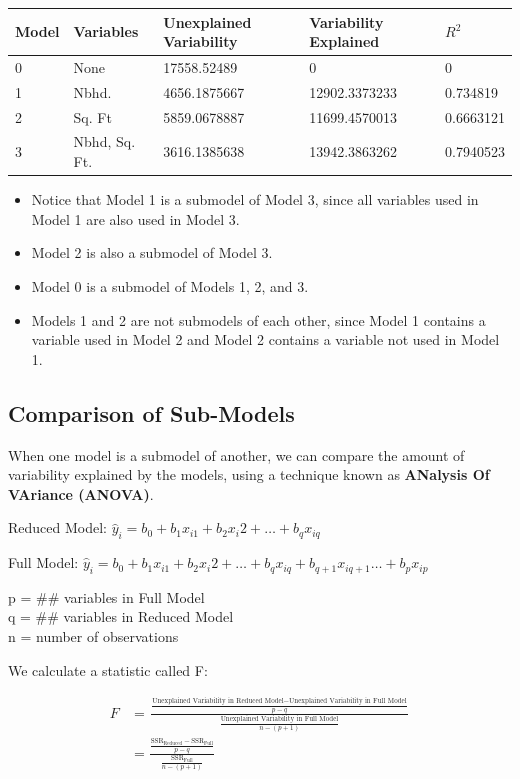 \documentclass[]{book}
\begin{document}
\begin{longtable}[]{@{}lllll@{}}
\toprule
Model & Variables & Unexplained Variability & Variability Explained &
\(R^2\)\tabularnewline
\midrule
\endhead
0 & None & 17558.52489 & 0 & 0\tabularnewline
1 & Nbhd. & 4656.1875667 & 12902.3373233 & 0.734819\tabularnewline
2 & Sq. Ft & 5859.0678887 & 11699.4570013 & 0.6663121\tabularnewline
3 & Nbhd, Sq. Ft. & 3616.1385638 & 13942.3863262 &
0.7940523\tabularnewline
\bottomrule
\end{longtable}

\begin{itemize}
\item
  Notice that Model 1 is a submodel of Model 3, since all variables used
  in Model 1 are also used in Model 3.
\item
  Model 2 is also a submodel of Model 3.
\item
  Model 0 is a submodel of Models 1, 2, and 3.
\item
  Models 1 and 2 are not submodels of each other, since Model 1 contains
  a variable used in Model 2 and Model 2 contains a variable not used in
  Model 1.
\end{itemize}

\subsection{Comparison of Sub-Models}\label{comparison-of-sub-models}

When one model is a submodel of another, we can compare the amount of
variability explained by the models, using a technique known as
\textbf{ANalysis Of VAriance (ANOVA)}.

Reduced Model:
\(\hat{y}_i = b_0 + b_1x_{i1} + b_2{x_i2} + \ldots + b_qx_{iq}\)

Full Model:
\(\hat{y}_i = b_0 + b_1x_{i1} + b_2{x_i2} + \ldots + b_qx_{iq} + b_{q+1}x_{i{q+1}} \ldots + b_px_{ip}\)

p = \#\# variables in Full Model\\
q = \#\# variables in Reduced Model\\
n = number of observations

We calculate a statistic called F:

\[
\begin{aligned}
F  &=\frac{\frac{\text{Unexplained Variability in Reduced Model}-\text{Unexplained Variability in Full Model}}{p-q}}{\frac{\text{Unexplained Variability in Full Model}}{n-(p+1)}} \\
&= \frac{\frac{\text{SSR}_{\text{Reduced}}-\text{SSR}_{\text{Full}}}{p-q}}{\frac{\text{SSR}_{\text{Full}}}{n-(p+1)}}
\end{aligned}
\]
\end{document}
